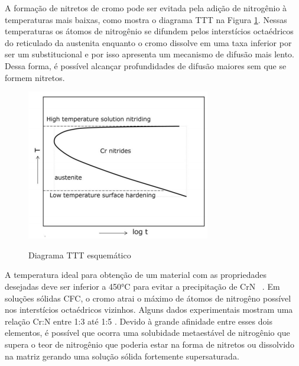 \documentclass[]{politex}
\begin{document}
	A formação de nitretos de cromo pode ser evitada pela adição de nitrogênio à temperaturas mais baixas, como mostra o diagrama TTT na Figura \ref{fig:TTTN}. Nessas temperaturas os átomos de nitrogênio se difundem pelos interstícios octaédricos do reticulado da austenita enquanto o cromo dissolve em uma taxa inferior por ser um substitucional e por isso apresenta um mecanismo de difusão mais lento. Dessa forma, é possível alcançar profundidades de difusão maiores sem que se formem nitretos.\par

	\begin{figure}[ht]
	\caption{Diagrama TTT esquemático}
	\includegraphics{TTTN}
	\label{fig:TTTN}
	\centering
	\end{figure}
	
	A temperatura ideal para obtenção de um material com as propriedades desejadas deve ser inferior a 450°C para evitar a precipitação de CrN ~\cite{moskalioviene2011modeling}.
	Em soluções sólidas CFC, o cromo atrai o máximo de átomos de nitrogêno possível nos interstícios octaédricos vizinhos. Alguns dados experimentais mostram uma relação Cr:N entre 1:3 até 1:5 \cite{somers2018expanded}. Devido à grande afinidade entre esses dois elementos, é possível que ocorra uma solubidade metaestável de nitrogênio que supera o teor de nitrogênio que poderia estar na forma de nitretos ou dissolvido na matriz gerando uma solução sólida fortemente supersaturada.
	
\end{document}
